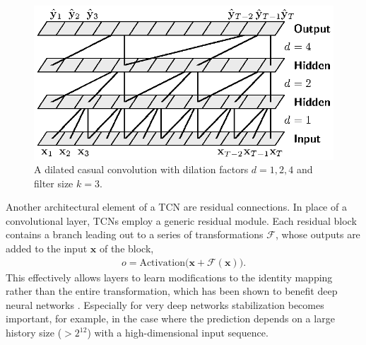 \documentclass{scrartcl}
\begin{document}
\begin{figure}[htbp]
\centering
\includegraphics[scale=1]{figures/dilated_conv.eps}
\caption{A dilated casual convolution with dilation factors $d = 1,2,4$ and filter size $k=3$.}
\label{fig:dilated_convolutions} 
\end{figure}

Another architectural element of a TCN are residual connections. In place of a convolutional layer, TCNs employ a generic residual module. Each residual block contains a branch leading out to a series of transformations $\mathcal F$, whose outputs are added to the input $\mathbf x$ of the block, 
\begin{align}
o = \text{Activation} \big(\mathbf x + \mathcal F(\mathbf x)\big).
\end{align}
This effectively allows layers to learn modifications to the identity mapping rather than the entire transformation, which has been shown to benefit deep neural networks \cite{He2016}. Especially for very deep networks stabilization becomes important, for example, in the case where the prediction depends on a large history size ($> 2^{12}$) with a high-dimensional input sequence. 
\end{document}
